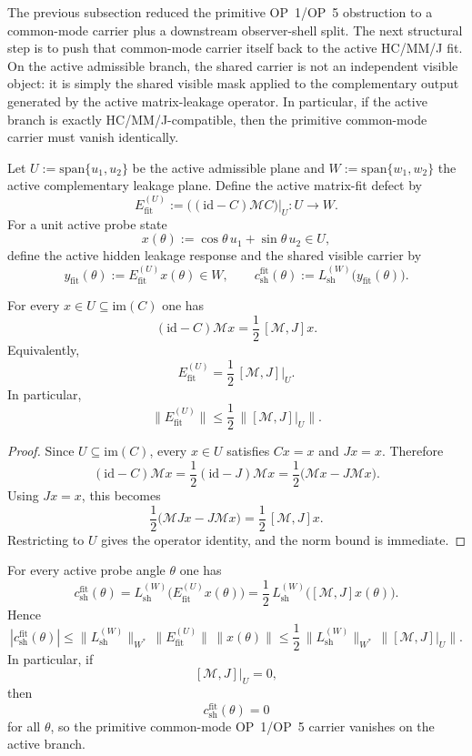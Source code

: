 The previous subsection reduced the primitive OP~1/OP~5 obstruction to a common-mode carrier plus a downstream observer-shell split. The next structural step is to push that common-mode carrier itself back to the active HC/MM/J fit. On the active admissible branch, the shared carrier is not an independent visible object: it is simply the shared visible mask applied to the complementary output generated by the active matrix-leakage operator. In particular, if the active branch is exactly HC/MM/J-compatible, then the primitive common-mode carrier must vanish identically.

\begin{definition}
Let $U:=\mathrm{span}\{u_1,u_2\}$ be the active admissible plane and $W:=\mathrm{span}\{w_1,w_2\}$ the active complementary leakage plane. Define the active matrix-fit defect by
\[
  E_{\mathrm{fit}}^{(U)} := \bigl((\mathrm{id}-C)\mathcal M C\bigr)\big|_{U}: U\to W.
\]
For a unit active probe state
\[
  x(\theta):=\cos\theta\,u_1+\sin\theta\,u_2\in U,
\]
define the active hidden leakage response and the shared visible carrier by
\[
  y_{\mathrm{fit}}(\theta):=E_{\mathrm{fit}}^{(U)}x(\theta)\in W,
  \qquad
  c_{\mathrm{sh}}^{\mathrm{fit}}(\theta):=L_{\mathrm{sh}}^{(W)}\bigl(y_{\mathrm{fit}}(\theta)\bigr).
\]
\end{definition}

\begin{proposition}
For every $x\in U\subseteq \mathrm{im}(C)$ one has
\[
  (\mathrm{id}-C)\mathcal M x
  =
  \frac12\,[\mathcal M,J]x.
\]
Equivalently,
\[
  E_{\mathrm{fit}}^{(U)}
  =
  \frac12\,[\mathcal M,J]\big|_{U}.
\]
In particular,
\[
  \|E_{\mathrm{fit}}^{(U)}\|
  \le
  \frac12\,\|[\mathcal M,J]\big|_{U}\|.
\]
\end{proposition}

\begin{proof}
Since $U\subseteq \mathrm{im}(C)$, every $x\in U$ satisfies $Cx=x$ and $Jx=x$. Therefore
\[
  (\mathrm{id}-C)\mathcal M x
  =
  \frac12(\mathrm{id}-J)\mathcal M x
  =
  \frac12\bigl(\mathcal Mx-J\mathcal Mx\bigr).
\]
Using $Jx=x$, this becomes
\[
  \frac12\bigl(\mathcal MJx-J\mathcal Mx\bigr)
  =
  \frac12\,[\mathcal M,J]x.
\]
Restricting to $U$ gives the operator identity, and the norm bound is immediate.
\end{proof}

\begin{theorem}
For every active probe angle $\theta$ one has
\[
  c_{\mathrm{sh}}^{\mathrm{fit}}(\theta)
  =
  L_{\mathrm{sh}}^{(W)}\bigl(E_{\mathrm{fit}}^{(U)}x(\theta)\bigr)
  =
  \frac12\,L_{\mathrm{sh}}^{(W)}\bigl([\mathcal M,J]x(\theta)\bigr).
\]
Hence
\[
  |c_{\mathrm{sh}}^{\mathrm{fit}}(\theta)|
  \le
  \|L_{\mathrm{sh}}^{(W)}\|_{W^*}\,\|E_{\mathrm{fit}}^{(U)}\|\,\|x(\theta)\|
  \le
  \frac12\,\|L_{\mathrm{sh}}^{(W)}\|_{W^*}\,\|[\mathcal M,J]\big|_{U}\|.
\]
In particular, if
\[
  [\mathcal M,J]\big|_{U}=0,
\]
then
\[
  c_{\mathrm{sh}}^{\mathrm{fit}}(\theta)=0
\]
for all $\theta$, so the primitive common-mode OP~1/OP~5 carrier vanishes on the active branch.
\end{theorem}

